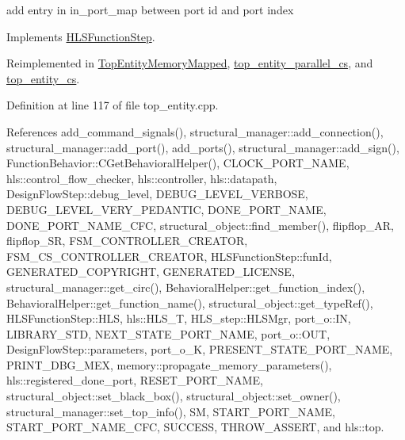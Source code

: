add entry in in\+\_\+port\+\_\+map between port id and port index 

Implements \hyperlink{classHLSFunctionStep_a8db4c00d080655984d98143206fc9fa8}{H\+L\+S\+Function\+Step}.



Reimplemented in \hyperlink{classTopEntityMemoryMapped_a33c5cbfe6f3cbd462a0f48e0a000674f}{Top\+Entity\+Memory\+Mapped}, \hyperlink{classtop__entity__parallel__cs_a1df713ee7535a6ef73f1df004ca4aa43}{top\+\_\+entity\+\_\+parallel\+\_\+cs}, and \hyperlink{classtop__entity__cs_a5d81c98939f48e4bdd7fe81f651000a2}{top\+\_\+entity\+\_\+cs}.



Definition at line 117 of file top\+\_\+entity.\+cpp.



References add\+\_\+command\+\_\+signals(), structural\+\_\+manager\+::add\+\_\+connection(), structural\+\_\+manager\+::add\+\_\+port(), add\+\_\+ports(), structural\+\_\+manager\+::add\+\_\+sign(), Function\+Behavior\+::\+C\+Get\+Behavioral\+Helper(), C\+L\+O\+C\+K\+\_\+\+P\+O\+R\+T\+\_\+\+N\+A\+ME, hls\+::control\+\_\+flow\+\_\+checker, hls\+::controller, hls\+::datapath, Design\+Flow\+Step\+::debug\+\_\+level, D\+E\+B\+U\+G\+\_\+\+L\+E\+V\+E\+L\+\_\+\+V\+E\+R\+B\+O\+SE, D\+E\+B\+U\+G\+\_\+\+L\+E\+V\+E\+L\+\_\+\+V\+E\+R\+Y\+\_\+\+P\+E\+D\+A\+N\+T\+IC, D\+O\+N\+E\+\_\+\+P\+O\+R\+T\+\_\+\+N\+A\+ME, D\+O\+N\+E\+\_\+\+P\+O\+R\+T\+\_\+\+N\+A\+M\+E\+\_\+\+C\+FC, structural\+\_\+object\+::find\+\_\+member(), flipflop\+\_\+\+AR, flipflop\+\_\+\+SR, F\+S\+M\+\_\+\+C\+O\+N\+T\+R\+O\+L\+L\+E\+R\+\_\+\+C\+R\+E\+A\+T\+OR, F\+S\+M\+\_\+\+C\+S\+\_\+\+C\+O\+N\+T\+R\+O\+L\+L\+E\+R\+\_\+\+C\+R\+E\+A\+T\+OR, H\+L\+S\+Function\+Step\+::fun\+Id, G\+E\+N\+E\+R\+A\+T\+E\+D\+\_\+\+C\+O\+P\+Y\+R\+I\+G\+HT, G\+E\+N\+E\+R\+A\+T\+E\+D\+\_\+\+L\+I\+C\+E\+N\+SE, structural\+\_\+manager\+::get\+\_\+circ(), Behavioral\+Helper\+::get\+\_\+function\+\_\+index(), Behavioral\+Helper\+::get\+\_\+function\+\_\+name(), structural\+\_\+object\+::get\+\_\+type\+Ref(), H\+L\+S\+Function\+Step\+::\+H\+LS, hls\+::\+H\+L\+S\+\_\+T, H\+L\+S\+\_\+step\+::\+H\+L\+S\+Mgr, port\+\_\+o\+::\+IN, L\+I\+B\+R\+A\+R\+Y\+\_\+\+S\+TD, N\+E\+X\+T\+\_\+\+S\+T\+A\+T\+E\+\_\+\+P\+O\+R\+T\+\_\+\+N\+A\+ME, port\+\_\+o\+::\+O\+UT, Design\+Flow\+Step\+::parameters, port\+\_\+o\+\_\+K, P\+R\+E\+S\+E\+N\+T\+\_\+\+S\+T\+A\+T\+E\+\_\+\+P\+O\+R\+T\+\_\+\+N\+A\+ME, P\+R\+I\+N\+T\+\_\+\+D\+B\+G\+\_\+\+M\+EX, memory\+::propagate\+\_\+memory\+\_\+parameters(), hls\+::registered\+\_\+done\+\_\+port, R\+E\+S\+E\+T\+\_\+\+P\+O\+R\+T\+\_\+\+N\+A\+ME, structural\+\_\+object\+::set\+\_\+black\+\_\+box(), structural\+\_\+object\+::set\+\_\+owner(), structural\+\_\+manager\+::set\+\_\+top\+\_\+info(), SM, S\+T\+A\+R\+T\+\_\+\+P\+O\+R\+T\+\_\+\+N\+A\+ME, S\+T\+A\+R\+T\+\_\+\+P\+O\+R\+T\+\_\+\+N\+A\+M\+E\+\_\+\+C\+FC, S\+U\+C\+C\+E\+SS, T\+H\+R\+O\+W\+\_\+\+A\+S\+S\+E\+RT, and hls\+::top.



